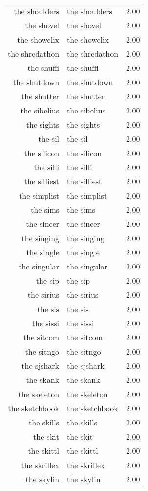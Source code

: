 \begin{table}[ht]
\begin{tabular}{rlr}
  the shoulders & the shoulders & 2.00 \\ 
  the shovel & the shovel & 2.00 \\ 
  the showclix & the showclix & 2.00 \\ 
  the shredathon & the shredathon & 2.00 \\ 
  the shuffl & the shuffl & 2.00 \\ 
  the shutdown & the shutdown & 2.00 \\ 
  the shutter & the shutter & 2.00 \\ 
  the sibelius & the sibelius & 2.00 \\ 
  the sights & the sights & 2.00 \\ 
  the sil & the sil & 2.00 \\ 
  the silicon & the silicon & 2.00 \\ 
  the silli & the silli & 2.00 \\ 
  the silliest & the silliest & 2.00 \\ 
  the simplist & the simplist & 2.00 \\ 
  the sims & the sims & 2.00 \\ 
  the sincer & the sincer & 2.00 \\ 
  the singing & the singing & 2.00 \\ 
  the single & the single & 2.00 \\ 
  the singular & the singular & 2.00 \\ 
  the sip & the sip & 2.00 \\ 
  the sirius & the sirius & 2.00 \\ 
  the sis & the sis & 2.00 \\ 
  the sissi & the sissi & 2.00 \\ 
  the sitcom & the sitcom & 2.00 \\ 
  the sitngo & the sitngo & 2.00 \\ 
  the sjshark & the sjshark & 2.00 \\ 
  the skank & the skank & 2.00 \\ 
  the skeleton & the skeleton & 2.00 \\ 
  the sketchbook & the sketchbook & 2.00 \\ 
  the skills & the skills & 2.00 \\ 
  the skit & the skit & 2.00 \\ 
  the skittl & the skittl & 2.00 \\ 
  the skrillex & the skrillex & 2.00 \\ 
  the skylin & the skylin & 2.00 \\ 

\end{tabular}
\end{table}
